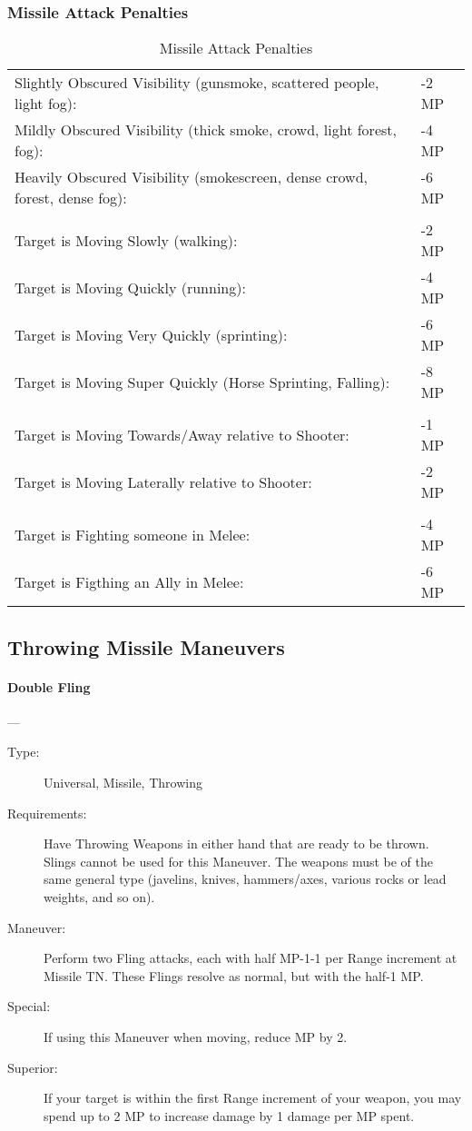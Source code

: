 \documentclass[oneside,11pt,english]{book}
\begin{document}
\subsubsection{Missile Attack Penalties}
\begin{table}[!ht]
  \caption{Missile Attack Penalties}
  \label{tab:Missile Attack Penalties}
  \begin{tabu} spread 0pt {X[5,L]X[-1,r]}
    Slightly Obscured Visibility (gunsmoke, scattered people, light fog):& -2 MP \\
    Mildly Obscured Visibility (thick smoke, crowd, light forest, fog):& -4 MP \\
    Heavily Obscured Visibility (smokescreen, dense crowd, forest, dense fog):& -6 MP \\
    \\
    Target is Moving Slowly (walking):& -2 MP \\
    Target is Moving Quickly (running):& -4 MP \\
    Target is Moving Very Quickly (sprinting):& -6 MP \\
    Target is Moving Super Quickly (Horse Sprinting, Falling):& -8 MP \\
    \\
    Target is Moving Towards/Away relative to Shooter:& -1 MP \\
    Target is Moving Laterally relative to Shooter:& -2 MP \\
    \\
    Target is Fighting someone in Melee:& -4 MP \\
    Target is Figthing an Ally in Melee:& -6 MP \\
  \end{tabu}
\end{table}

\subsection{Throwing Missile Maneuvers}
\paragraph{\large\label{man:Double Fling}Double Fling}---\quad{\large[???????]}
\vspace{-10pt}\begin{description} 
\item [Type:] Universal, Missile, Throwing 
\item [Requirements:] Have Throwing Weapons in either hand that are ready to be thrown. Slings cannot be 
  used for this Maneuver. The weapons must be of the same general type (javelins, knives, hammers/axes, 
  various rocks or lead weights, and so on). 
\item [Maneuver:] Perform two Fling attacks, each with half MP-1-1 per Range increment at Missile TN. These 
  Flings resolve as normal, but with the half-1 MP. 
\item [Special:] If using this Maneuver when moving, reduce MP by 2. 
\item [Superior:] If your target is within the first Range increment of your weapon, you may spend up to 2 MP to 
  increase damage by 1 damage per MP spent. 
\end{description}
\end{document}
